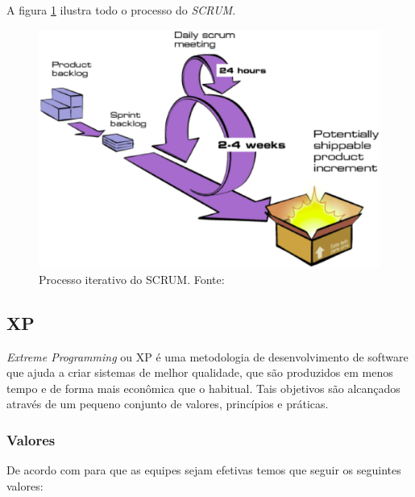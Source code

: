 A figura \ref{fig:scrum} ilustra todo o processo do \textit{SCRUM}.

\begin{figure}[h!]
	\centering
  \includegraphics[keepaspectratio=true,scale=0.6]{figuras/scrum.eps}
  \caption[Processo iterativo do SCRUM.]{Processo iterativo do SCRUM. Fonte: \cite{diniz}}
	\label{fig:scrum}
\end{figure}

\subsection{XP}

\textit{Extreme Programming} ou XP é uma metodologia de desenvolvimento de software que ajuda a criar sistemas de melhor qualidade, que são produzidos em menos tempo e de forma mais econômica que o habitual. Tais objetivos são alcançados através de um pequeno conjunto de valores, princípios e práticas. \cite{beck}

\subsubsection{Valores}

De acordo com \cite{beck} para que as equipes sejam efetivas temos que seguir os seguintes valores:

